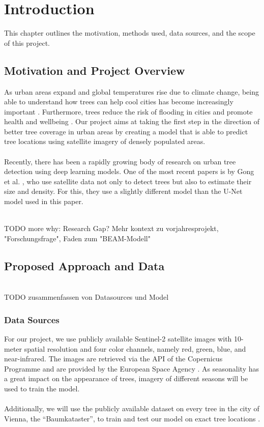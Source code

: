 \section{Introduction}

This chapter outlines the motivation, methods used, data sources, and the scope of this project.

\subsection{Motivation and Project Overview}

As urban areas expand and global temperatures rise due to climate change, being able to understand how trees can help cool cities has become increasingly important \cite{eu2023tree}. Furthermore, trees reduce the risk of flooding in cities and promote health and wellbeing \cite{woodlandtrust2023}. Our project aims at taking the first step in the direction of better tree coverage in urban areas by creating a model that is able to predict tree locations using satellite imagery of densely populated areas. \\
\\
Recently, there has been a rapidly growing body of research on urban tree detection using deep learning models. One of the most recent papers is by Gong et al. \cite{gong2024treedetector}, who use satellite data not only to detect trees but also to estimate their size and density. For this, they use a slightly different model than the U-Net model used in this paper.

\\TODO more why: Research Gap? Mehr kontext zu vorjahresprojekt, "Forschungsfrage", Faden zum "BEAM-Modell"

\subsection{Proposed Approach and Data} \\TODO zusammenfassen von Datasources und Model
\subsubsection{Data Sources}

For our project, we use publicly available Sentinel-2 satellite images with 10-meter spatial resolution and four color channels, namely red, green, blue, and near-infrared. The images are retrieved via the API of the Copernicus Programme and are provided by the European Space Agency \cite{copernicus2025}. As seasonality has a great impact on the appearance of trees, imagery of different seasons will be used to train the model. \\
\\
Additionally, we will use the publicly available dataset on every tree in the city of Vienna, the ``Baumkataster'', to train and test our model on exact tree locations \cite{baumkataster2025}.

